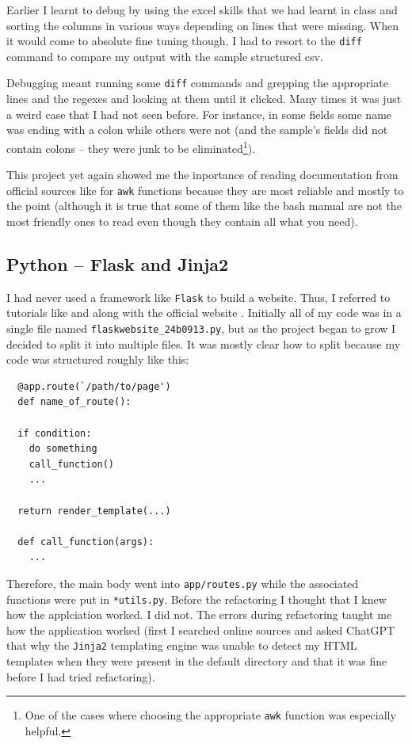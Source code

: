 \documentclass[11pt]{scrartcl}
\begin{document}
Earlier I learnt to debug by using the excel skills that we had learnt in class
and sorting the columns in various ways depending on lines that were missing.
When it would come to absolute fine tuning though, I had to resort to the
\texttt{diff} command to compare my output with the sample structured csv.

Debugging meant running some \texttt{diff} commands and grepping the appropriate
lines and the regexes and looking at them until it clicked. Many times it was
just a weird case that I had not seen before. For instance, in some fields some
name was ending with a colon while others were not (and the sample's fields did
not contain colons -- they were junk to be eliminated\footnote{One of the cases
where choosing the appropriate \texttt{awk} function was especially helpful.}).

This project yet again showed me the inportance of reading documentation from
official sources like \cite{gawk-builtin-functions} for \texttt{awk} functions
because they are most reliable and mostly to the point (although it is true that
some of them like the bash manual are not the most friendly ones to read even
though they contain all what you need).




\subsection{Python -- Flask and Jinja2}

I had never used a framework like \texttt{Flask} to build a website. Thus, I
referred to tutorials like \cite{flasktutorial} and
\cite{learnflaskfreecodecamp} along with the official website \cite{flaskdocs}.
Initially all of my code was in a single file named
\texttt{flaskwebsite\_24b0913.py}, but as the project began to grow I decided to
split it into multiple files. It was mostly clear how to split because my code
was structured roughly like this:

\begin{verbatim}
  @app.route(`/path/to/page')
  def name_of_route():

  if condition:
    do something
    call_function()
    ...

  return render_template(...)

  def call_function(args):
    ...
\end{verbatim}

Therefore, the main body went into \texttt{app/routes.py} while the associated
functions were put in \texttt{*utils.py}. Before the refactoring I thought that
I knew how the applciation worked. I did not. The errors during refactoring
taught me how the application worked (first I searched online sources and asked
ChatGPT that why the \texttt{Jinja2} templating engine was unable to detect my
HTML templates when they were present in the default directory and that it was fine
before I had tried refactoring).
\end{document}
